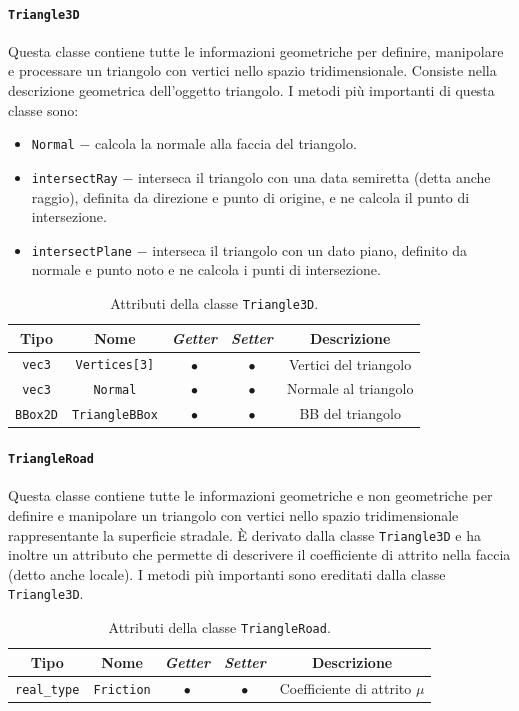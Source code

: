\paragraph{\texttt{Triangle3D}}
Questa classe contiene tutte le informazioni geometriche per definire, manipolare e processare un triangolo con vertici nello spazio tridimensionale. Consiste nella descrizione geometrica dell'oggetto triangolo. I metodi più importanti di questa classe sono:
\begin{itemize}
	\item \texttt{Normal} $-$ calcola la normale alla faccia del triangolo.
	\item \texttt{intersectRay} $-$ interseca il triangolo con una data semiretta (detta anche raggio), definita da direzione e punto di origine, e ne calcola il punto di intersezione.
	\item \texttt{intersectPlane} $-$ interseca il triangolo con un dato piano, definito da normale e punto noto e ne calcola i punti di intersezione.
\end{itemize}
\begin{table}[h!]
	\centering
	\begin{tabular}{|c|c|c|c|c|}
		\hline 
		\textbf{Tipo} & \textbf{Nome} & \textit{\textbf{Getter}} & \textit{\textbf{Setter}} & \textbf{Descrizione} \\ \hline 
		\texttt{vec3} & \texttt{Vertices[3]} & $\bullet$ & $\bullet$ & Vertici del triangolo \\ \hline 
		\texttt{vec3} & \texttt{Normal} & $\bullet$ & $\bullet$ & Normale al triangolo \\ \hline 
		\texttt{BBox2D} & \texttt{TriangleBBox} & $\bullet$ & $\bullet$ & \ac{BB} del triangolo \\ \hline
	\end{tabular}
	\caption{Attributi della classe \texttt{Triangle3D}.}
\end{table}
%
\paragraph{\texttt{TriangleRoad}}
Questa classe contiene tutte le informazioni geometriche e non geometriche per definire e manipolare un triangolo con vertici nello spazio tridimensionale rappresentante la superficie stradale. È derivato dalla classe \texttt{Triangle3D} e ha inoltre un attributo che permette di descrivere il coefficiente di attrito nella faccia (detto anche locale). I metodi più importanti sono ereditati dalla classe \texttt{Triangle3D}.
\begin{table}[h!]
	\centering
	\begin{tabular}{|c|c|c|c|c|}
		\hline 
		\textbf{Tipo} & \textbf{Nome} & \textit{\textbf{Getter}} & \textit{\textbf{Setter}} & \textbf{Descrizione} \\ \hline 
		\texttt{real\_type} & \texttt{Friction} & $\bullet$ & $\bullet$ & Coefficiente di attrito $\mu$ \\ \hline
	\end{tabular}
	\caption{Attributi della classe \texttt{TriangleRoad}.}
\end{table}
%

